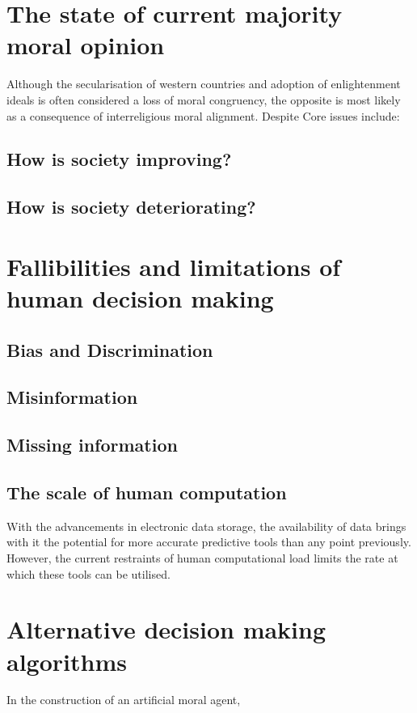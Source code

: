\section{The state of current majority moral opinion}
Although the secularisation of western countries and adoption of enlightenment ideals is often considered a loss of moral congruency, the opposite is most likely as a consequence of interreligious moral alignment.
Despite 
Core issues include:

\subsection{How is society improving?}

\subsection{How is society deteriorating?}

\section{Fallibilities and limitations of human decision making}
\subsection{Bias and Discrimination}
\subsection{Misinformation}
\subsection{Missing information}
\subsection{The scale of human computation}
With the advancements in electronic data storage, the availability of data brings with it the potential for more accurate predictive tools than any point previously.
However, the current restraints of human computational load limits the rate at which these tools can be utilised.

\section{Alternative decision making algorithms}
In the construction of an artificial moral agent, 
